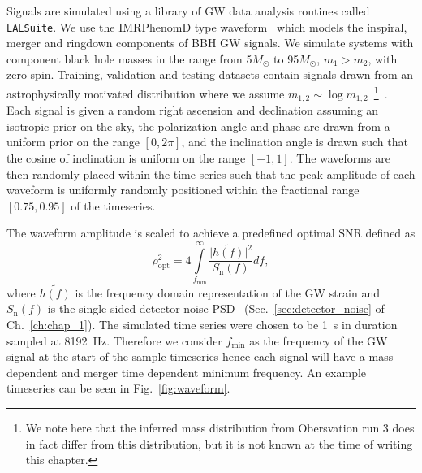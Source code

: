 %
%
Signals are simulated using a library of \ac{GW} data analysis routines 
called \texttt{LALSuite}. We use the IMRPhenomD type
waveform~\cite{PhysRevD.93.044006,PhysRevD.93.044007} which models the
inspiral, merger and ringdown components of \ac{BBH} \ac{GW} signals. 
We simulate systems with component black hole masses in the range from
5\(M_\odot\) to 95\(M_\odot\), $m_{1} > m_{2}$, with zero spin.
Training, validation and testing datasets contain signals 
drawn from an astrophysically motivated distribution where we assume
$m_{1,2}\sim\log{m_{1,2}}$~\cite{PhysRevX.6.041015}\footnote{We note here that the inferred mass distribution from Obersvation run 3 does in fact differ from this distribution, but it is not known at the time of writing this chapter.}~. Each signal is given a random right ascension and declination assuming an isotropic prior on the sky, the polarization angle and phase are drawn from a uniform prior on the range $[0,2\pi]$, and the inclination angle is drawn such that the cosine of
inclination is uniform on the range $[-1,1]$. The waveforms are then randomly placed within the time series such that the peak amplitude of each waveform is uniformly randomly positioned within the fractional range $[0.75,0.95]$ of the timeseries. 

%
%
The waveform amplitude is scaled to achieve a predefined optimal \ac{SNR} defined as
%
%
\begin{equation}\label{eq:snr} 
\rho_{\mathrm{opt}}^{2} = 4
\int\limits_{f_{\mathrm{min}}}^{\infty} \frac{\lvert
\tilde{h(f)}\rvert^{2}}{S_{\mathrm{n}}(f)} df,
\end{equation}
%
where $\tilde{h(f)}$ is the frequency domain representation of the
\ac{GW} strain and $S_{\mathrm{n}}(f)$ is the single-sided detector noise
\ac{PSD}~\cite{PhysRevD.85.122006} (Sec.~\ref{sec:detector_noise} of 
Ch.~\ref{ch:chap_1}). The simulated time series were chosen to be 1~s 
in duration sampled at 8192~Hz. Therefore we consider $f_{\mathrm{min}}$ 
as the frequency of the \ac{GW} signal at the start of the sample 
timeseries hence each signal will have a mass dependent and 
merger time dependent minimum frequency. 
An example timeseries can be seen in Fig.~\ref{fig:waveform}. 

